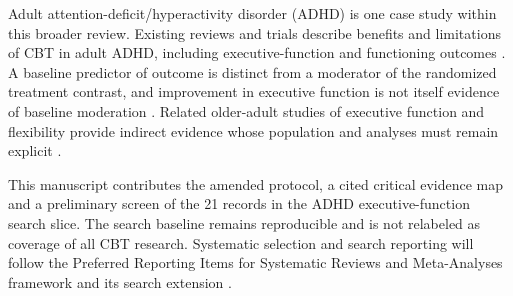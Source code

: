 Adult attention-deficit/hyperactivity disorder (ADHD) is one case study within this broader review.
Existing reviews and trials describe benefits and limitations of CBT in adult ADHD, including executive-function and functioning outcomes \citep{Lopez2018,Safren2010,Liu2026,LopezPinar2026}.
A baseline predictor of outcome is distinct from a moderator of the randomized treatment contrast, and improvement in executive function is not itself evidence of baseline moderation \citep{Kraemer2002}.
Related older-adult studies of executive function and flexibility provide indirect evidence whose population and analyses must remain explicit \citep{Mohlman2005,Johnco2014}.

This manuscript contributes the amended protocol, a cited critical evidence map and a preliminary screen of the 21 records in the ADHD executive-function search slice.
The search baseline remains reproducible and is not relabeled as coverage of all CBT research.
Systematic selection and search reporting will follow the Preferred Reporting Items for Systematic Reviews and Meta-Analyses framework and its search extension \citep{Page2021,Rethlefsen2021}.
